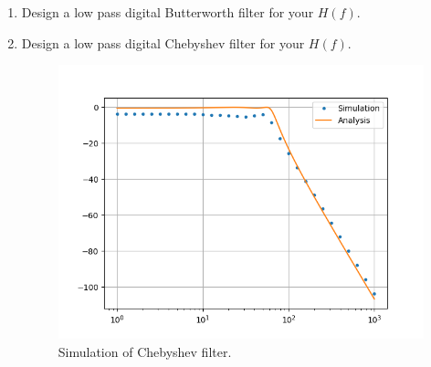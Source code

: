 \documentclass[journal,12pt,twocolumn]{IEEEtran}
\renewcommand\thesection{\arabic{section}}
\begin{document}
\begin{enumerate}[label=\thesection.\arabic*
,ref=\thesection.\theenumi]
This circuit is simulated in the ngspice code 
Download the python code from
\begin{lstlisting}
$ wget https://raw.githubusercontent.com/kn-vardhan/EE3900-Digital-Signal-Processing/main/Charger/codes/5_4.py
\end{lstlisting}
The above code compares the amplitude response
of the simulated circuit with the theoretical expression.
\newpage
\item Design a low pass digital Butterworth filter for your $H(f)$.

\solution 

\item Design a low pass digital Chebyshev filter for your $H(f)$.

\solution
\begin{figure}
    \includegraphics[width=\columnwidth]{figs/5_4.png}
    \caption{Simulation of Chebyshev filter.}
    \label{fig:sim-cheby}
\end{figure}
\end{enumerate}
\end{document}
